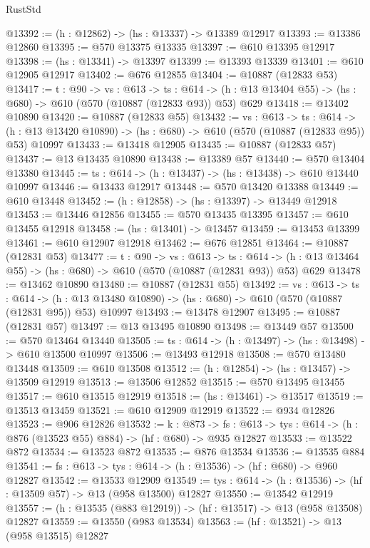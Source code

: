 \begin{lexlean}{RustStd}
\begin{coremodule}
@13392 := (h : @12862) -> (hs : @13337) -> @13389 @12917
@13393 := @13386 @12860
@13395 := @570 @13375 @13335
@13397 := @610 @13395 @12917
@13398 := (hs : @13341) -> @13397
@13399 := @13393 @13339
@13401 := @610 @12905 @12917
@13402 := @676 @12855
@13404 := @10887 (@12833 @53)
@13417 := {t : @90} ->
  {vs : @613} ->
  {ts : @614} -> (h : @13 @13404 @55) -> (hs : @680) -> @610 (@570 (@10887 (@12833 @93)) @53) @629
@13418 := @13402 @10890
@13420 := @10887 (@12833 @55)
@13432 := {vs : @613} ->
  {ts : @614} ->
  (h : @13 @13420 @10890) -> (hs : @680) -> @610 (@570 (@10887 (@12833 @95)) @53) @10997
@13433 := @13418 @12905
@13435 := @10887 (@12833 @57)
@13437 := @13 @13435 @10890
@13438 := @13389 @57
@13440 := @570 @13404 @13380
@13445 := {ts : @614} -> (h : @13437) -> (hs : @13438) -> @610 @13440 @10997
@13446 := @13433 @12917
@13448 := @570 @13420 @13388
@13449 := @610 @13448
@13452 := (h : @12858) -> (hs : @13397) -> @13449 @12918
@13453 := @13446 @12856
@13455 := @570 @13435 @13395
@13457 := @610 @13455 @12918
@13458 := (hs : @13401) -> @13457
@13459 := @13453 @13399
@13461 := @610 @12907 @12918
@13462 := @676 @12851
@13464 := @10887 (@12831 @53)
@13477 := {t : @90} ->
  {vs : @613} ->
  {ts : @614} -> (h : @13 @13464 @55) -> (hs : @680) -> @610 (@570 (@10887 (@12831 @93)) @53) @629
@13478 := @13462 @10890
@13480 := @10887 (@12831 @55)
@13492 := {vs : @613} ->
  {ts : @614} ->
  (h : @13 @13480 @10890) -> (hs : @680) -> @610 (@570 (@10887 (@12831 @95)) @53) @10997
@13493 := @13478 @12907
@13495 := @10887 (@12831 @57)
@13497 := @13 @13495 @10890
@13498 := @13449 @57
@13500 := @570 @13464 @13440
@13505 := {ts : @614} -> (h : @13497) -> (hs : @13498) -> @610 @13500 @10997
@13506 := @13493 @12918
@13508 := @570 @13480 @13448
@13509 := @610 @13508
@13512 := (h : @12854) -> (hs : @13457) -> @13509 @12919
@13513 := @13506 @12852
@13515 := @570 @13495 @13455
@13517 := @610 @13515 @12919
@13518 := (hs : @13461) -> @13517
@13519 := @13513 @13459
@13521 := @610 @12909 @12919
@13522 := @934 @12826
@13523 := @906 @12826
@13532 := {k : @873} ->
  {fs : @613} -> {tys : @614} -> (h : @876 (@13523 @55) @884) -> (hf : @680) -> @935 @12827
@13533 := @13522 @872
@13534 := @13523 @872
@13535 := @876 @13534
@13536 := @13535 @884
@13541 := {fs : @613} -> {tys : @614} -> (h : @13536) -> (hf : @680) -> @960 @12827
@13542 := @13533 @12909
@13549 := {tys : @614} -> (h : @13536) -> (hf : @13509 @57) -> @13 (@958 @13500) @12827
@13550 := @13542 @12919
@13557 := (h : @13535 (@883 @12919)) -> (hf : @13517) -> @13 (@958 @13508) @12827
@13559 := @13550 (@983 @13534)
@13563 := (hf : @13521) -> @13 (@958 @13515) @12827

\end{coremodule}
\end{lexlean}
